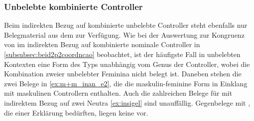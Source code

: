 \subsubsection{Unbelebte kombinierte Controller}

Beim indirekten Bezug auf kombinierte unbelebte Controller steht ebenfalls nur
Belegmaterial aus dem \CAO{} zur Verfügung. Wie bei der Auswertung zur
Kongruenz von  im indirekten Bezug auf kombinierte nominale
Controller in \cref{subsubsec:beid2p2coordncao} beobachtet, ist der häufigste
Fall in unbelebten Kontexten eine Form des Typs  unabhängig vom
Genus der Controller, wobei die Kombination zweier unbelebter Feminina nicht
belegt ist. Daneben stehen die zwei Belege in \cref{ex:m+m_inan_e2}, die die
maskulin-feminine Form  in Einklang mit maskulinen Controllern
enthalten. Auch die zahlreichen Belege für  mit indirektem Bezug
auf zwei Neutra \cref{ex:insigel} sind unauffällig. Gegenbelege mit
, die einer Erklärung bedürften, liegen keine vor.

